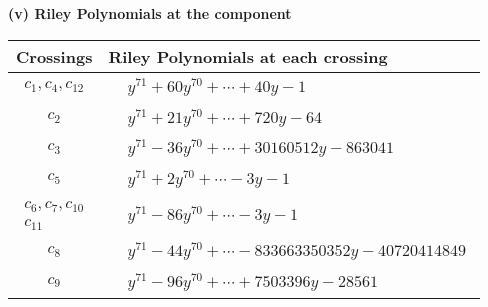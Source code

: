\documentclass[1p]{elsarticle_modified}
\theoremstyle{definition}
\begin{document}
\newpage\renewcommand{\arraystretch}{1}
\flushleft \textbf{(v) Riley Polynomials at the component}\newline \\
\begin{tabular}{m{50pt}|m{274pt}}
Crossings & \hspace{64pt}Riley Polynomials at each crossing \\
\hline $$\begin{aligned}c_{1},c_{4},c_{12}\end{aligned}$$&$\begin{aligned}
&y^{71}+60 y^{70}+\cdots+40 y-1
\end{aligned}$\\
\hline $$\begin{aligned}c_{2}\end{aligned}$$&$\begin{aligned}
&y^{71}+21 y^{70}+\cdots+720 y-64
\end{aligned}$\\
\hline $$\begin{aligned}c_{3}\end{aligned}$$&$\begin{aligned}
&y^{71}-36 y^{70}+\cdots+30160512 y-863041
\end{aligned}$\\
\hline $$\begin{aligned}c_{5}\end{aligned}$$&$\begin{aligned}
&y^{71}+2 y^{70}+\cdots-3 y-1
\end{aligned}$\\
\hline $$\begin{aligned}c_{6},c_{7},c_{10}\\c_{11}\end{aligned}$$&$\begin{aligned}
&y^{71}-86 y^{70}+\cdots-3 y-1
\end{aligned}$\\
\hline $$\begin{aligned}c_{8}\end{aligned}$$&$\begin{aligned}
&y^{71}-44 y^{70}+\cdots-833663350352 y-40720414849
\end{aligned}$\\
\hline $$\begin{aligned}c_{9}\end{aligned}$$&$\begin{aligned}
&y^{71}-96 y^{70}+\cdots+7503396 y-28561
\end{aligned}$\\
\hline
\end{tabular}\\~\\
\end{document}
